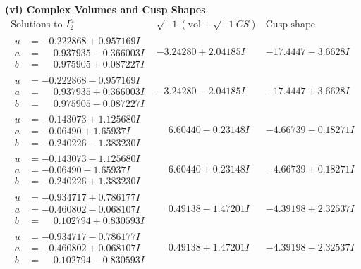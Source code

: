 \documentclass[1p]{elsarticle_modified}
\theoremstyle{definition}
\newcommand{\I}{\sqrt{-1}}
\begin{document}
\newpage\flushleft \textbf{(vi) Complex Volumes and Cusp Shapes}
$$\begin{array}{c|c|c}  
\text{Solutions to }I^u_{2}& \I (\text{vol} + \sqrt{-1}CS) & \text{Cusp shape}\\
 \hline 
\begin{aligned}
u &= -0.222868 + 0.957169 I \\
a &= \phantom{-}0.937935 - 0.366003 I \\
b &= \phantom{-}0.975905 + 0.087227 I\end{aligned}
 & -3.24280 + 2.04185 I & -17.4447 - 3.6628 I \\ \hline\begin{aligned}
u &= -0.222868 - 0.957169 I \\
a &= \phantom{-}0.937935 + 0.366003 I \\
b &= \phantom{-}0.975905 - 0.087227 I\end{aligned}
 & -3.24280 - 2.04185 I & -17.4447 + 3.6628 I \\ \hline\begin{aligned}
u &= -0.143073 + 1.125680 I \\
a &= -0.06490 + 1.65937 I \\
b &= -0.240226 - 1.383230 I\end{aligned}
 & \phantom{-}6.60440 - 0.23148 I & -4.66739 - 0.18271 I \\ \hline\begin{aligned}
u &= -0.143073 - 1.125680 I \\
a &= -0.06490 - 1.65937 I \\
b &= -0.240226 + 1.383230 I\end{aligned}
 & \phantom{-}6.60440 + 0.23148 I & -4.66739 + 0.18271 I \\ \hline\begin{aligned}
u &= -0.934717 + 0.786177 I \\
a &= -0.460802 - 0.068107 I \\
b &= \phantom{-}0.102794 + 0.830593 I\end{aligned}
 & \phantom{-}0.49138 - 1.47201 I & -4.39198 + 2.32537 I \\ \hline\begin{aligned}
u &= -0.934717 - 0.786177 I \\
a &= -0.460802 + 0.068107 I \\
b &= \phantom{-}0.102794 - 0.830593 I\end{aligned}
 & \phantom{-}0.49138 + 1.47201 I & -4.39198 - 2.32537 I \\ \hline\begin{aligned}

\end{aligned}
\end{array}$$
\end{document}
